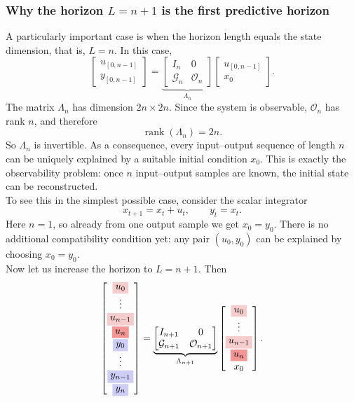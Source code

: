 \subsubsection{Why the horizon $L=n+1$ is the first predictive horizon}
A particularly important case is when the horizon length equals the state dimension, that is, $L=n$. In this case,
\[
\begin{bmatrix}
u_{[0,n-1]}\\[1mm]
y_{[0,n-1]}
\end{bmatrix}
=
\underbrace{
\begin{bmatrix}
I_n & 0\\
\mathcal{G}_n & \mathcal{O}_n
\end{bmatrix}}_{\Lambda_n}
\begin{bmatrix}
u_{[0,n-1]}\\[1mm]
x_0
\end{bmatrix}.
\]
The matrix $\Lambda_n$ has dimension $2n\times 2n$. Since the system is observable, $\mathcal{O}_n$ has rank $n$, and therefore
\[
\operatorname{rank}(\Lambda_n)=2n.
\]
So $\Lambda_n$ is invertible. As a consequence, every input--output sequence of length $n$ can be uniquely explained by a suitable initial condition $x_0$. This is exactly the observability problem: once $n$ input--output samples are known, the initial state can be reconstructed.\\
To see this in the simplest possible case, consider the scalar integrator
\[
x_{t+1}=x_t+u_t,
\qquad
y_t=x_t.
\]
Here $n=1$, so already from one output sample we get $x_0=y_0$. There is no additional compatibility condition yet: any pair $(u_0,y_0)$ can be explained by choosing $x_0=y_0$.\\
Now let us increase the horizon to $L=n+1$. Then
\[
\begin{bmatrix}
\colorbox{lightred}{$\displaystyle u_0$}\\
\vdots\\
\colorbox{lightred}{$\displaystyle u_{n-1}$}\\
\colorbox{midred}{$\displaystyle u_n$}\\
\colorbox{lightblue}{$\displaystyle y_0$}\\
\vdots\\
\colorbox{lightblue}{$\displaystyle y_{n-1}$}\\
\colorbox{lightblue}{$\displaystyle y_n$}
\end{bmatrix}
=
\underbrace{
\begin{bmatrix}
I_{n+1} & 0\\
\mathcal{G}_{n+1} & \mathcal{O}_{n+1}
\end{bmatrix}}_{\Lambda_{n+1}}
\begin{bmatrix}
\colorbox{lightred}{$\displaystyle u_0$}\\
\vdots\\
\colorbox{lightred}{$\displaystyle u_{n-1}$}\\
\colorbox{midred}{$\displaystyle u_n$}\\
x_0
\end{bmatrix}.
\]
